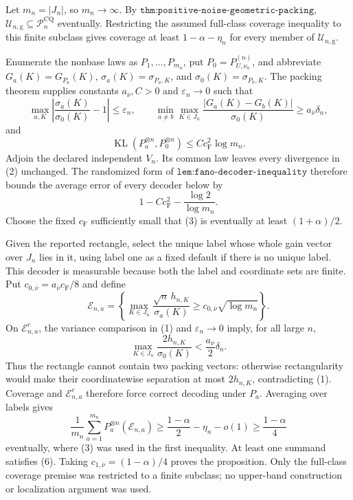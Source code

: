 Let \(m_n=|J_n|\), so \(m_n\to\infty\).  By \(\texttt{thm:positive-noise-geometric-packing}\), \(\mathcal U_{n,\mathrm g}\subseteq\mathcal P_n^{\mathrm{CQ}}\) eventually.  Restricting the assumed full-class coverage inequality to this finite subclass gives coverage at least \(1-\alpha-\eta_n\) for every member of \(\mathcal U_{n,\mathrm g}\).

Enumerate the nonbase laws as \(P_1,\ldots,P_{m_n}\), put \(P_0=P_{U,\nu_n}^{(n)}\), and abbreviate \(G_a(K)=G_{P_a}(K)\), \(\sigma_a(K)=\sigma_{P_a,K}\), and \(\sigma_0(K)=\sigma_{P_0,K}\).  The packing theorem supplies constants \(a_{\bar\nu},C>0\) and \(\varepsilon_n\to0\) such that
\[
 \max_{a,K}\left|\frac{\sigma_a(K)}{\sigma_0(K)}-1\right|\leq\varepsilon_n,
 \qquad
 \min_{a\ne b}\max_{K\in J_n}\frac{|G_a(K)-G_b(K)|}{\sigma_0(K)}
 \geq a_{\bar\nu}\delta_n,                                             \tag{1}
\]
and
\[
 \operatorname{KL}(P_a^{\otimes n},P_0^{\otimes n})
 \leq Cc_{\mathrm F}^2\log m_n.                                         \tag{2}
\]
Adjoin the declared independent \(V_n\).  Its common law leaves every divergence in (2) unchanged.  The randomized form of \(\texttt{lem:fano-decoder-inequality}\) therefore bounds the average error of every decoder below by
\[
 1-Cc_{\mathrm F}^2-\frac{\log2}{\log m_n}.                              \tag{3}
\]
Choose the fixed \(c_{\mathrm F}\) sufficiently small that (3) is eventually at least \((1+\alpha)/2\).

Given the reported rectangle, select the unique label whose whole gain vector over \(J_n\) lies in it, using label one as a fixed default if there is no unique label.  This decoder is measurable because both the label and coordinate sets are finite.  Put \(c_{0,\bar\nu}=a_{\bar\nu}c_{\mathrm F}/8\) and define
\[
 \mathcal E_{n,a}=\left\{\max_{K\in J_n}
 \frac{\sqrt n\,h_{n,K}}{\sigma_a(K)}
 \geq c_{0,\bar\nu}\sqrt{\log m_n}\right\}.                           \tag{4}
\]
On \(\mathcal E_{n,a}^c\), the variance comparison in (1) and \(\varepsilon_n\to0\) imply, for all large \(n\),
\[
 \max_{K\in J_n}\frac{2h_{n,K}}{\sigma_0(K)}
 <\frac{a_{\bar\nu}}2\delta_n.                                          \tag{5}
\]
Thus the rectangle cannot contain two packing vectors: otherwise rectangularity would make their coordinatewise separation at most \(2h_{n,K}\), contradicting (1).  Coverage and \(\mathcal E_{n,a}^c\) therefore force correct decoding under \(P_a\).  Averaging over labels gives
\[
 \frac1{m_n}\sum_{a=1}^{m_n}P_a^{\otimes n}(\mathcal E_{n,a})
 \geq \frac{1-\alpha}{2}-\eta_n-o(1)
 \geq\frac{1-\alpha}{4}                                                  \tag{6}
\]
eventually, where (3) was used in the first inequality.  At least one summand satisfies (6).  Taking \(c_{1,\bar\nu}=(1-\alpha)/4\) proves the proposition.  Only the full-class coverage premise was restricted to a finite subclass; no upper-band construction or localization argument was used.